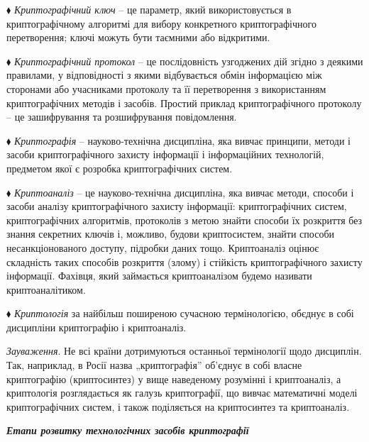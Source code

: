 \documentclass[a4paper]{article}
\newcounter{}
\begin{document}
${\blacklozenge}$ \textit{Криптографічний ключ }– це параметр, який
використовується в криптографічному алгоритмі для вибору конкретного
криптографічного перетворення; ключі можуть бути таємними або відкритими.

${\blacklozenge}$ \textit{Криптографічний протокол }– це послідовність
узгоджених дій згідно з деякими правилами, у відповідності з якими відбувається
обмін інформацією між сторонами або учасниками протоколу та її перетворення з
використанням криптографічних методів і засобів.  Простий приклад
криптографічного протоколу – це зашифрування та розшифрування повідомлення. 

${\blacklozenge}$ \textit{Криптографія }– науково-технічна дисципліна, яка
вивчає принципи, методи і засоби криптографічного захисту інформації і
інформаційних технологій, предметом якої є розробка криптографічних систем.

${\blacklozenge}$ \textit{Криптоаналіз } – це науково-технічна дисципліна, яка
вивчає методи, способи і засоби аналізу криптографічного захисту інформації:
криптографічних систем, криптографічних алгоритмів, протоколів з метою знайти
способи їх розкриття без знання секретних ключів і, можливо, будови
криптосистем, знайти способи несанкціонованого доступу, підробки даних тощо.
Криптоаналіз оцінює складність таких способів  розкриття (злому) і стійкість
криптографічного захисту інформації. Фахівця, який займається криптоаналізом
будемо називати криптоаналітиком. 

${\blacklozenge}$ \textit{Криптологія }за найбільш поширеною сучасною
термінологією, об{\textquotesingle}єднує в собі дисципліни криптографію і
криптоаналіз. 


\bigskip


\bigskip

{\par}


\bigskip

\textit{Зауваження}. Не всі  країни дотримуються останньої термінології щодо
дисциплін. Так, наприклад, в Росії назва „криптографія” об’єднує в собі власне
криптографію (криптосинтез) у вище наведеному розумінні і криптоаналіз, а
криптологія розглядається як галузь криптографії, що вивчає математичні моделі
криптографічних систем, і також поділяється на криптосинтез та криптоаналіз.


\bigskip


\bigskip

{\centering\bfseries\itshape
Етапи розвитку технологічних засобів  криптографії
\par}
\end{document}
